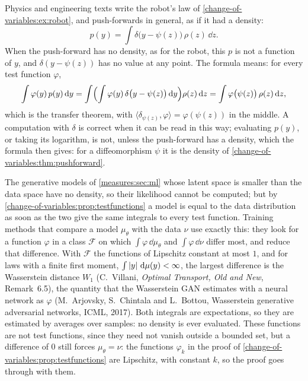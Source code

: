 \begin{notechapter}
\begin{pitfall}
Physics and engineering texts write the robot's law of
\cref{change-of-variables:ex:robot}, and push-forwards in general, as if
it had a density:
\[
  p(y) = \int\delta\bigl(y - \psi(z)\bigr)\,\rho(z)\,\dd z .
\]
When the push-forward has no density, as for the robot, this $p$ is not
a function of $y$, and $\delta(y - \psi(z))$ has no value at any point.
The formula means: for every test function $\varphi$,
\[
  \int\varphi(y)\,p(y)\,\mathrm{d} y
  = \int\Bigl(\int\varphi(y)\,\delta\bigl(y - \psi(z)\bigr)\,\mathrm{d} y\Bigr)
    \rho(z)\,\mathrm{d} z
  = \int\varphi\bigl(\psi(z)\bigr)\,\rho(z)\,\mathrm{d} z ,
\]
which is the transfer theorem, with
$\langle\delta_{\psi(z)}, \varphi\rangle = \varphi(\psi(z))$ in the
middle. A computation with $\delta$ is correct when it can be read in
this way; evaluating $p(y)$, or taking its logarithm, is not, unless the
push-forward has a density, which the formula then gives: for a
diffeomorphism $\psi$ it is the density of
\cref{change-of-variables:thm:pushforward}.
\end{pitfall}

\begin{mlthread}
The generative models of \cref{measures:sec:ml} whose latent space is
smaller than the data space have no density, so their likelihood
cannot be computed; but by
\cref{change-of-variables:prop:testfunctions} a model is equal to the
data distribution as soon as the two give the same integrals to every
test function. Training methods that compare a model $\mu_\theta$ with
the data $\nu$ use exactly this: they look for a function $\varphi$
in a class $\mathcal F$ on which $\int\varphi\,\dd\mu_\theta$ and
$\int\varphi\,\dd\nu$ differ most, and reduce that difference. With
$\mathcal F$ the functions of Lipschitz constant at most $1$, and for
laws with a finite first moment, $\int\left|y\right|\,\mathrm{d}\mu(y) < \infty$, the
largest difference is the Wasserstein distance $W_1$ (C.~Villani,
\emph{Optimal Transport, Old and New}, Remark~6.5), the quantity that the
Wasserstein GAN estimates with a neural network as $\varphi$
(M.~Arjovsky, S.~Chintala and L.~Bottou, Wasserstein generative
adversarial networks, ICML, 2017). Both integrals are expectations, so
they are estimated by averages over samples: no density is ever
evaluated. These functions are not test functions, since they need not
vanish outside a bounded set, but a difference of $0$ still forces
$\mu_\theta = \nu$: the functions $\varphi_k$ in the proof of
\cref{change-of-variables:prop:testfunctions} are Lipschitz, with
constant $k$, so the proof goes through with them.
\end{mlthread}


\end{notechapter}
